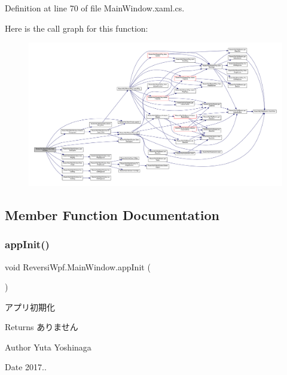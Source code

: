 Definition at line 70 of file Main\+Window.\+xaml.\+cs.

Here is the call graph for this function\+:
\nopagebreak
\begin{figure}[H]
\begin{center}
\leavevmode
\includegraphics[width=350pt]{class_reversi_wpf_1_1_main_window_af64ecb3857a3d547b4020e9900048360_cgraph}
\end{center}
\end{figure}


\subsection{Member Function Documentation}
\mbox{\label{class_reversi_wpf_1_1_main_window_a4e9c1014738c9b72f093dbc179ce984e}} 
\subsubsection{\texorpdfstring{app\+Init()}{appInit()}}
{\footnotesize\ttfamily void Reversi\+Wpf.\+Main\+Window.\+app\+Init (\begin{DoxyParamCaption}{ }\end{DoxyParamCaption})}



アプリ初期化 

\begin{DoxyReturn}{Returns}
ありません 
\end{DoxyReturn}
\begin{DoxyAuthor}{Author}
Yuta Yoshinaga 
\end{DoxyAuthor}
\begin{DoxyDate}{Date}
2017.. 
\end{DoxyDate}


